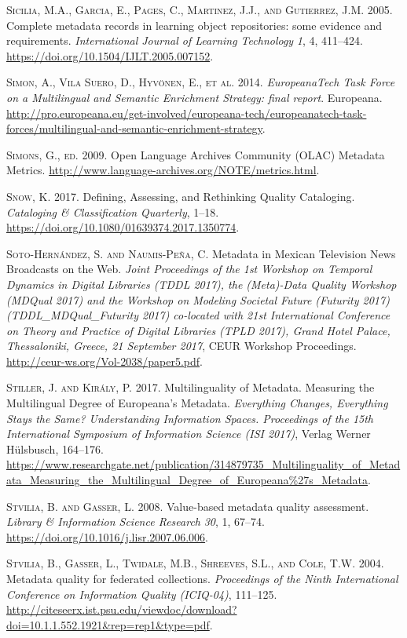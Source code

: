 \textsc{Sicilia, M.A., Garcia, E., Pages, C., Martinez, J.J., and Gutierrez, J.M.} 2005. Complete metadata records in learning object repositories: some evidence and requirements. \emph{International Journal of Learning Technology} \emph{1}, 4, 411–424. \url{https://doi.org/10.1504/IJLT.2005.007152}.

\textsc{Simon, A., Vila Suero, D., Hyvönen, E., et al.} 2014. \emph{EuropeanaTech Task Force on a Multilingual and Semantic Enrichment Strategy: final report}. Europeana. \url{http://pro.europeana.eu/get-involved/europeana-tech/europeanatech-task-forces/multilingual-and-semantic-enrichment-strategy}.

\textsc{Simons, G., ed.} 2009. Open Language Archives Community (OLAC) Metadata Metrics. \url{http://www.language-archives.org/NOTE/metrics.html}.

\textsc{Snow, K.} 2017. Defining, Assessing, and Rethinking Quality Cataloging. \emph{Cataloging \& Classification Quarterly}, 1–18. \url{https://doi.org/10.1080/01639374.2017.1350774}.

\textsc{Soto-Hernández, S. and Naumis-Peña, C.} Metadata in Mexican Television News Broadcasts on the Web. \emph{Joint Proceedings of the 1st Workshop on Temporal Dynamics in Digital Libraries (TDDL 2017), the (Meta)-Data Quality Workshop (MDQual 2017) and the Workshop on Modeling Societal Future (Futurity 2017) (TDDL\_MDQual\_Futurity 2017) co-located with 21st International Conference on Theory and Practice of Digital Libraries (TPLD 2017), Grand Hotel Palace, Thessaloniki, Greece, 21 September 2017}, CEUR Workshop Proceedings. \url{http://ceur-ws.org/Vol-2038/paper5.pdf}.

\textsc{Stiller, J. and Király, P.} 2017. Multilinguality of Metadata. Measuring the Multilingual Degree of Europeana’s Metadata. \emph{Everything Changes, Everything Stays the Same? Understanding Information Spaces. Proceedings of the 15th International Symposium of Information Science (ISI 2017)}, Verlag Werner Hülsbusch, 164–176. \url{https://www.researchgate.net/publication/314879735_Multilinguality_of_Metadata_Measuring_the_Multilingual_Degree_of_Europeana%27s_Metadata}.

\textsc{Stvilia, B. and Gasser, L.} 2008. Value-based metadata quality assessment. \emph{Library \& Information Science Research} \emph{30}, 1, 67–74. \url{https://doi.org/10.1016/j.lisr.2007.06.006}.

\textsc{Stvilia, B., Gasser, L., Twidale, M.B., Shreeves, S.L., and Cole, T.W.} 2004. Metadata quality for federated collections. \emph{Proceedings of the Ninth International Conference on Information Quality (ICIQ-04)}, 111–125. \url{http://citeseerx.ist.psu.edu/viewdoc/download?doi=10.1.1.552.1921\&rep=rep1\&type=pdf}.

